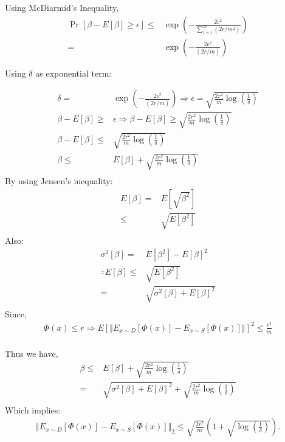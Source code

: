 \documentclass{article}
\begin{document}
\begin{description}
    Using McDiarmid's Inequality,
    \begin{align*}
      \Pr\left[\beta-E[\beta]\geq\epsilon\right] \leq & \exp\left(-\frac{2\epsilon^{2}}{\sum_{i=1}^{m}\left(2r/m^{2}\right)}\right) \\
      = & \exp\left(-\frac{2\epsilon^{2}}{\left(2r/m\right)}\right)
    \end{align*}

    Using $ \delta $ as exponential term:

    \begin{align*}
      \delta= & \exp\left(-\frac{2\epsilon^{2}}{\left(2r/m\right)}\right)\Rightarrow\epsilon=\sqrt{\frac{2r^{2}}{m}\log\left(\frac{1}{\delta}\right)}\\
      \beta-E[\beta] \geq & \epsilon\Rightarrow\beta-E[\beta]\geq\sqrt{\frac{2r^{2}}{m}\log\left(\frac{1}{\delta}\right)} \\
      \beta-E[\beta] \leq & \sqrt{\frac{2r^{2}}{m}\log\left(\frac{1}{\delta}\right)} \\
      \beta \leq & E[\beta]+\sqrt{\frac{2r^{2}}{m}\log\left(\frac{1}{\delta}\right)} \\
    \end{align*}
    By using Jensen's inequality:
    \begin{align*}
      E[\beta]= & E\left[\sqrt{\beta^{2}}\right]\\
      \leq & \sqrt{E\left[\beta^{2}\right]} \\
    \end{align*}
    Also:
    \begin{align*}
      \sigma^{2}[\beta] = & E\left[\beta^{2}\right]-E{\left[\beta\right]}^{2} \\
      \therefore E[\beta] \leq & \sqrt{E\left[\beta^{2}\right]} \\ 
      = & \sqrt{\sigma^{2}[\beta]+E{\left[\beta\right]}^{2}}\\
    \end{align*}
    Since,
    \begin{align*}
      \Phi(x)\leq r\Rightarrow E{\left[\left\Vert E_{x\sim D}\left[\Phi(x)\right]-E_{x\sim S}\left[\Phi(x)\right]\right\Vert \right]}^{2}\leq\frac{r^{2}}{m} \\
    \end{align*}

    Thus we have, 
    \begin{align*}
      \beta \leq & E[\beta]+\sqrt{\frac{2r^{2}}{m}\log\left(\frac{1}{\delta}\right)} \\
      = & \sqrt{\sigma^{2}[\beta]+E{\left[\beta\right]}^{2}}+\sqrt{\frac{2r^{2}}{m}\log\left(\frac{1}{\delta}\right)}\\
    \end{align*}
    Which implies:
    \begin{align*}
      \left\Vert E_{x\sim D}\left[\Phi(x)\right]-E_{x\sim S}\left[\Phi(x)\right]\right\Vert _{2}\leq\sqrt{\frac{2r^{2}}{m}}\left(1+\sqrt{\log\left(\frac{1}{\delta}\right)}\right).\\
    \end{align*}
    
\end{description}
\end{document}

